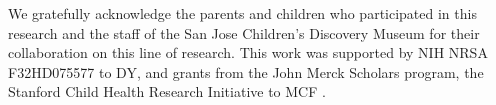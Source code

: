 \documentclass{pnastwo}
\begin{document}
\begin{article}
\begin{materials}
\end{materials}

\begin{acknowledgments}
We gratefully acknowledge the parents and children who participated in this research and the staff of the San Jose Children's Discovery Museum for their collaboration on this line of research. This work was supported by NIH NRSA F32HD075577 to DY,  and grants from the John Merck Scholars program, the Stanford Child Health Research Initiative to MCF .
\end{acknowledgments}




\end{article}
\end{document}
